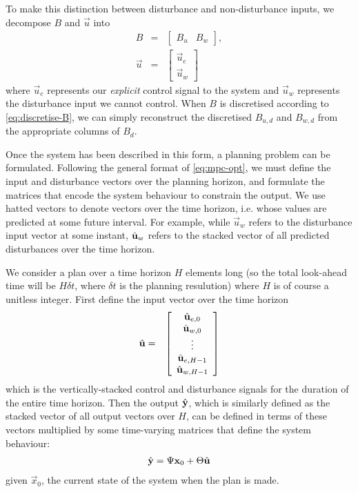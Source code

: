 To make this distinction between disturbance and non-disturbance inputs, we decompose $B$ and $\vec{u}$ into
\begin{eqnarray}
   B &=& \left[\begin{array}{cc}
      B_u & B_w
   \end{array}\right], \\
   \vec{u} &=& \left[\begin{array}{c}
      \vec{u}_e \\ \vec{u}_w
   \end{array}\right]
\end{eqnarray}
where $\vec{u}_e$ represents our \emph{explicit} control signal to the system and $\vec{u}_w$ represents the disturbance input we cannot control.
When $B$ is discretised according to \autoref{eq:discretise-B}, we can simply reconstruct the discretised $B_{u, d}$ and $B_{w, d}$ from the appropriate columns of $B_d$.

Once the system has been described in this form, a planning problem can be formulated.
Following the general format of \autoref{eq:mpc-opt}, we must define the input and disturbance vectors over the planning horizon, and formulate the matrices that encode the system behaviour to constrain the output.
We use hatted vectors to denote vectors over the time horizon, i.e. whose values are predicted at some future interval.
For example, while $\vec{u}_w$ refers to the disturbance input vector at some instant, $\hat{\mathbf{u}}_w$ refers to the stacked vector of all predicted disturbances over the time horizon.

We consider a plan over a time horizon $H$ elements long (so the total look-ahead time will be $H \delta t$, where $\delta t$ is the planning resulution) where $H$ is of course a unitless integer.
First define the input vector over the time horizon
\begin{eqnarray*}
   \hat{\mathbf{u}} &=& \left[\begin{array}{c}
      \hat{\mathbf{u}}_{e, 0} \\ \hat{\mathbf{u}}_{w, 0} \\
      \vdots \\
      \hat{\mathbf{u}}_{e, H-1} \\ \hat{\mathbf{u}}_{w, H-1}
   \end{array}\right]
\end{eqnarray*}
which is the vertically-stacked control and disturbance signals for the duration of the entire time horizon.
Then the output $\hat{\mathbf{y}}$, which is similarly defined as the stacked vector of all output vectors over $H$, can be defined in terms of these vectors multiplied by some time-varying matrices that define the system behaviour:
\begin{eqnarray}
   \label{eq:mpc-vectors}
	\hat{\mathbf{y}} = \Psi \mathbf{x}_0 + \Theta \hat{\mathbf{u}}
\end{eqnarray}
given $\vec{x}_0$, the current state of the system when the plan is made.

